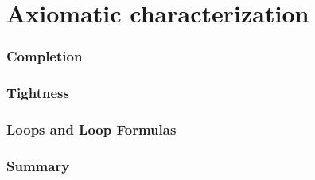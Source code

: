 \part{Axiomatic characterization}

\section{Completion}

\section{Tightness}

\section{Loops and Loop Formulas}

\section{Summary}

%
